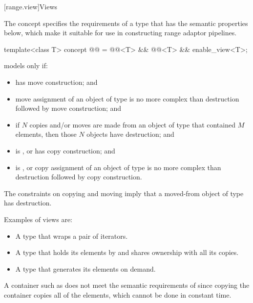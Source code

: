 [range.view]{Views}

\pnum
The  concept specifies the requirements of a  type
that has the semantic properties below,
which make it suitable for use in
constructing range adaptor pipelines.

\begin{itemdecl}
template<class T>
  concept @@ =
    @@<T> && @@<T> && enable_view<T>;
\end{itemdecl}

\begin{itemdescr}
\pnum
{} models  only if:
\begin{itemize}
\item
{} has  move construction; and

\item
move assignment of an object of type 
is no more complex than destruction followed by move construction; and

\item
if $N$ copies and/or moves are made from an object of type 
that contained $M$ elements,
then those $N$ objects have  destruction; and

\item
{} is , or
 has  copy construction; and

\item
{} is , or
copy assignment of an object of type 
is no more complex than destruction followed by copy construction.
\end{itemize}

\pnum
\begin{note}
The constraints on copying and moving imply that
a moved-from object of type  has  destruction.
\end{note}

\pnum
\begin{example}
Examples of views are:
\begin{itemize}
\item A  type that wraps a pair of iterators.

\item A  type that holds its elements by 
and shares ownership with all its copies.

\item A  type that generates its elements on demand.
\end{itemize}

A container such as 
does not meet the semantic requirements of 
since copying the container copies all of the elements,
which cannot be done in constant time.
\end{example}
\end{itemdescr}

